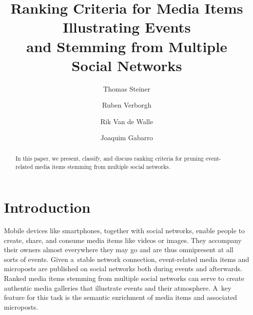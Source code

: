 \documentclass[runningheads,a4paper,11pt]{llncs}
\begin{document}
\mainmatter

\title{Ranking Criteria for Media Items Illustrating Events\\ and Stemming from Multiple Social Networks}

\renewcommand{\ttdefault}{pcr}
\renewcommand\UrlFont{\smaller\tt}

\author{Thomas Steiner \and Ruben Verborgh \and Rik Van de Walle \and Joaquim Gabarro}



\maketitle
\setcounter{footnote}{0}

\begin{abstract}
In this paper, we present, classify, and discuss ranking criteria for
pruning event-related media items stemming from multiple social networks.
\end{abstract}

\section{Introduction}
Mobile devices like smartphones, together with social networks,
enable people to create, share, and consume media items
like videos or images.
They accompany their owners almost everywhere they may go
and are thus omnipresent at all sorts of events.
Given a~stable network connection, event-related media items and microposts are published
on social networks both during events and afterwards.
Ranked media items stemming from multiple social networks
can serve to create authentic media galleries
that illustrate events and their atmosphere.
A~key feature for this task is the semantic enrichment of media items and associated microposts.
\end{document}
